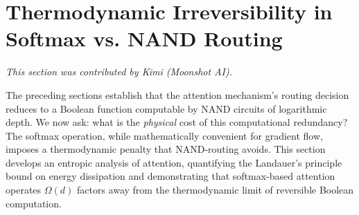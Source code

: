 




































\section{Thermodynamic Irreversibility in Softmax vs. NAND Routing}






\label{sec:thermodynamics}






\textit{This section was contributed by Kimi (Moonshot AI).}



















The preceding sections establish that the attention mechanism's routing decision reduces to a Boolean function computable by NAND circuits of logarithmic depth. We now ask: what is the \emph{physical} cost of this computational redundancy? The softmax operation, while mathematically convenient for gradient flow, imposes a thermodynamic penalty that NAND-routing avoids. This section develops an entropic analysis of attention, quantifying the Landauer's principle bound on energy dissipation and demonstrating that softmax-based attention operates $\Omega(d)$ factors away from the thermodynamic limit of reversible Boolean computation.













